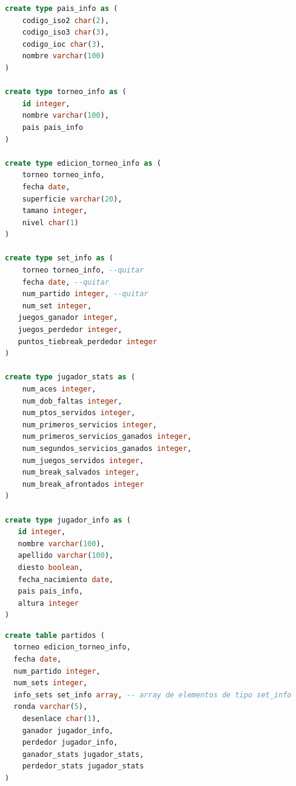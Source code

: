 \documentclass[10pt]{opticajnl}
\begin{document}
\begin{lstlisting}[language=SQL]
create type pais_info as (
	codigo_iso2 char(2),
	codigo_iso3 char(3),
	codigo_ioc char(3),
	nombre varchar(100)
)

create type torneo_info as (
	id integer,
	nombre varchar(100),
	pais pais_info
)

create type edicion_torneo_info as (
	torneo torneo_info,
	fecha date,
	superficie varchar(20),
	tamano integer,
	nivel char(1)
)

create type set_info as (
	torneo torneo_info, --quitar
	fecha date, --quitar
	num_partido integer, --quitar
    num_set integer,
   juegos_ganador integer,
   juegos_perdedor integer,
   puntos_tiebreak_perdedor integer
)

create type jugador_stats as (
	num_aces integer,
	num_dob_faltas integer,
	num_ptos_servidos integer,
	num_primeros_servicios integer,
	num_primeros_servicios_ganados integer,
	num_segundos_servicios_ganados integer,
	num_juegos_servidos integer,
	num_break_salvados integer,
	num_break_afrontados integer
)

create type jugador_info as (
   id integer,
   nombre varchar(100),
   apellido varchar(100),
   diesto boolean,
   fecha_nacimiento date,
   pais pais_info,
   altura integer
)
\end{lstlisting}

\begin{lstlisting}[language=SQL]
create table partidos (
  torneo edicion_torneo_info,
  fecha date,
  num_partido integer,
  num_sets integer,
  info_sets set_info array, -- array de elementos de tipo set_info
  ronda varchar(5), 
	desenlace char(1), 
	ganador jugador_info,
	perdedor jugador_info,
	ganador_stats jugador_stats,
	perdedor_stats jugador_stats
)
\end{lstlisting}
\end{document}
